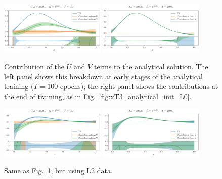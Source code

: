 \begin{figure}[ht!]
    \centering
    \includegraphics[width=0.45\textwidth]{plots/analytical_solution/u_v_decomposition/evolution_u_v_100_L0.pdf}
    \includegraphics[width=0.45\textwidth]{plots/analytical_solution/u_v_decomposition/evolution_u_v_20000_L0.pdf}
    \caption{Contribution of the $U$ and $V$ terms to the analytical solution. The left
    panel shows this breakdown at early stages of the analytical training
    ($T=100$ epochs); the right panel shows the contributions at the end of
    training, as in Fig.~\ref{fig:xT3_analytical_init_L0}.}
    \label{fig:xT3_u_v_contributions_L0}
  \end{figure}

  \begin{figure}[ht!]
    \centering
    \includegraphics[width=0.45\textwidth]{plots/analytical_solution/u_v_decomposition/evolution_u_v_100_L2.pdf}
    \includegraphics[width=0.45\textwidth]{plots/analytical_solution/u_v_decomposition/evolution_u_v_20000_L2.pdf}
    \caption{Same as Fig.~\ref{fig:xT3_u_v_contributions_L0}, but using L2 data.}
    \label{fig:xT3_u_v_contributions_L2}
  \end{figure}



